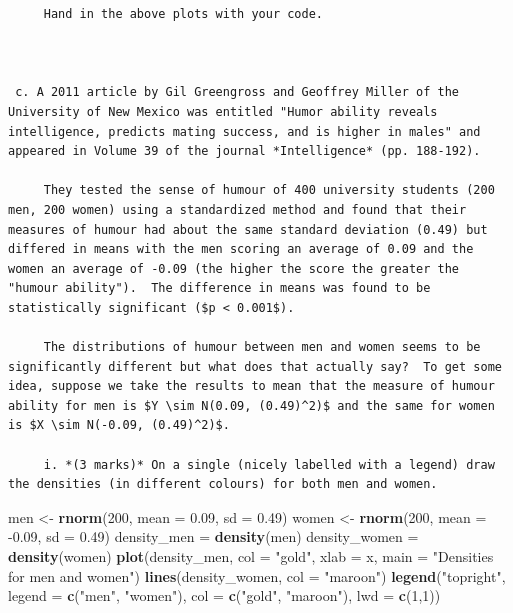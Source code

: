 \documentclass[
  9pt,
]{article}
\newenvironment{Shaded}{\begin{snugshade}}{\end{snugshade}}
\newcommand{\DataTypeTok}[1]{\textcolor[rgb]{0.13,0.29,0.53}{#1}}
\newcommand{\DecValTok}[1]{\textcolor[rgb]{0.00,0.00,0.81}{#1}}
\newcommand{\FloatTok}[1]{\textcolor[rgb]{0.00,0.00,0.81}{#1}}
\newcommand{\KeywordTok}[1]{\textcolor[rgb]{0.13,0.29,0.53}{\textbf{#1}}}
\newcommand{\NormalTok}[1]{#1}
\newcommand{\StringTok}[1]{\textcolor[rgb]{0.31,0.60,0.02}{#1}}
\begin{document}
\begin{verbatim}
     Hand in the above plots with your code.
          


 c. A 2011 article by Gil Greengross and Geoffrey Miller of the University of New Mexico was entitled "Humor ability reveals intelligence, predicts mating success, and is higher in males" and appeared in Volume 39 of the journal *Intelligence* (pp. 188-192).   
 
     They tested the sense of humour of 400 university students (200 men, 200 women) using a standardized method and found that their measures of humour had about the same standard deviation (0.49) but differed in means with the men scoring an average of 0.09 and the women an average of -0.09 (the higher the score the greater the "humour ability").  The difference in means was found to be statistically significant ($p < 0.001$).
     
     The distributions of humour between men and women seems to be significantly different but what does that actually say?  To get some idea, suppose we take the results to mean that the measure of humour ability for men is $Y \sim N(0.09, (0.49)^2)$ and the same for women is $X \sim N(-0.09, (0.49)^2)$.
     
     i. *(3 marks)* On a single (nicely labelled with a legend) draw the densities (in different colours) for both men and women.
\end{verbatim}

\begin{Shaded}
\begin{Highlighting}[]
\NormalTok{  men <{-}}\StringTok{ }\KeywordTok{rnorm}\NormalTok{(}\DecValTok{200}\NormalTok{, }\DataTypeTok{mean =} \FloatTok{0.09}\NormalTok{, }\DataTypeTok{sd =} \FloatTok{0.49}\NormalTok{)}
\NormalTok{  women <{-}}\StringTok{ }\KeywordTok{rnorm}\NormalTok{(}\DecValTok{200}\NormalTok{, }\DataTypeTok{mean =} \FloatTok{{-}0.09}\NormalTok{, }\DataTypeTok{sd =} \FloatTok{0.49}\NormalTok{)}
\NormalTok{  density\_men =}\StringTok{ }\KeywordTok{density}\NormalTok{(men)}
\NormalTok{  density\_women =}\StringTok{ }\KeywordTok{density}\NormalTok{(women)}
  \KeywordTok{plot}\NormalTok{(density\_men, }\DataTypeTok{col =} \StringTok{"gold"}\NormalTok{, }\DataTypeTok{xlab =} \StringTok{\textquotesingle{}x\textquotesingle{}}\NormalTok{, }\DataTypeTok{main =} \StringTok{"Densities for men and women"}\NormalTok{)}
  \KeywordTok{lines}\NormalTok{(density\_women, }\DataTypeTok{col =} \StringTok{"maroon"}\NormalTok{)}
\KeywordTok{legend}\NormalTok{(}\StringTok{"topright"}\NormalTok{, }\DataTypeTok{legend =} \KeywordTok{c}\NormalTok{(}\StringTok{"men"}\NormalTok{, }\StringTok{"women"}\NormalTok{), }\DataTypeTok{col =} \KeywordTok{c}\NormalTok{(}\StringTok{"gold"}\NormalTok{, }\StringTok{"maroon"}\NormalTok{), }\DataTypeTok{lwd =} \KeywordTok{c}\NormalTok{(}\DecValTok{1}\NormalTok{,}\DecValTok{1}\NormalTok{))}
\end{Highlighting}
\end{Shaded}
\end{document}
